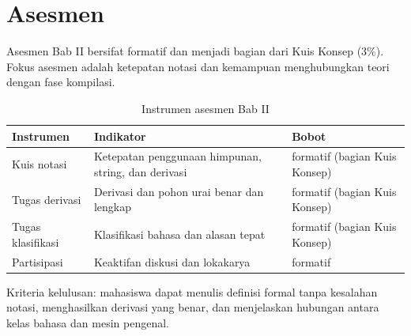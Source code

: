 \section*{Asesmen}

Asesmen Bab II bersifat formatif dan menjadi bagian dari Kuis Konsep
(3\%). Fokus asesmen adalah ketepatan notasi dan kemampuan
menghubungkan teori dengan fase kompilasi.

\begin{table}[H]
\centering
\caption{Instrumen asesmen Bab II}
\label{tab:ch02-asesmen}
\begin{tabularx}{\textwidth}{@{}lXl@{}}
\toprule
\textbf{Instrumen} & \textbf{Indikator} & \textbf{Bobot} \\
\midrule
Kuis notasi & Ketepatan penggunaan himpunan, string, dan derivasi &
formatif (bagian Kuis Konsep) \\
Tugas derivasi & Derivasi dan pohon urai benar dan lengkap &
formatif (bagian Kuis Konsep) \\
Tugas klasifikasi & Klasifikasi bahasa dan alasan tepat &
formatif (bagian Kuis Konsep) \\
Partisipasi & Keaktifan diskusi dan lokakarya & formatif \\
\bottomrule
\end{tabularx}
\end{table}

Kriteria kelulusan: mahasiswa dapat menulis definisi formal tanpa
kesalahan notasi, menghasilkan derivasi yang benar, dan menjelaskan
hubungan antara kelas bahasa dan mesin pengenal.

